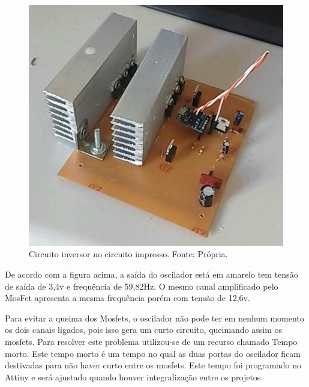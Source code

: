                 \begin{figure}[!htb]
            		\centering
            		\includegraphics[scale= 0.4]{figuras/Inversor_pronto.jpg}
            		\caption{Circuito inversor no circuito impresso. Fonte: Própria.}
            		\label{inversor-pronto}
            	\end{figure} 		
            	
				De acordo com a figura acima, a saída do oscilador está em amarelo tem tensão 					de saída de 3,4v e frequência de 59,82Hz. O mesmo canal amplificado pelo 						MosFet apresenta a mesma frequência porém com tensão de 12,6v. 
				
				Para evitar a queima dos Mosfets, o oscilador não pode ter em nenhum momento 					os dois canais ligados, pois isso gera um curto circuito, queimando assim os 					mosfets. Para resolver este problema utilizou-se de um recurso chamado Tempo 					morto. Este tempo morto é um tempo no qual as duas portas do oscilador ficam 					destivadas para não haver curto entre os mosfets. Este tempo foi programado no 				Attiny e será ajustado quando houver integralização entre os projetos.           
				
